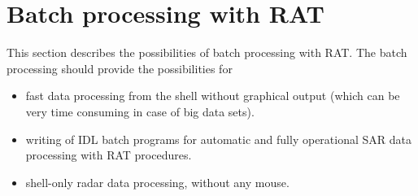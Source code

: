 \section{Batch processing with RAT}

This section describes the possibilities of batch processing with RAT. The
batch processing should provide the possibilities for

\begin{itemize}
  \item fast data processing from the shell without graphical output (which can
  be very time consuming in case of big data sets).
  \item writing of IDL batch
  programs for automatic and fully operational SAR data processing with RAT
  procedures.
  \item shell-only radar data processing, without any mouse.
\end{itemize}

